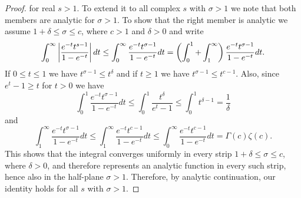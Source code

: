 \begin{proof}
	for real $s > 1$. To extend it to all complex $s$ with $\sigma > 1$ we note that both members are analytic for $\sigma > 1$. To show that the right member is analytic we assume $1 + \delta \leq \sigma \leq c$, where $c > 1$ and $\delta > 0$ and write
\begin{equation*}
	\int _0 ^\infty \left|\frac{e^{-t} t^{s - 1}}{1 - e^{-t}}\right| dt \leq \int _0 ^\infty \frac{e^{-t} t^{\sigma - 1}}{1 - e^{-t}} dt = \left(\int _0 ^1 + \int _1 ^\infty\right) \frac{e^{-t} t^{\sigma - 1}}{1 - e^{-t}} dt.
\end{equation*}
	If $0 \leq t \leq 1$ we have $t^{\sigma - 1} \leq t^\delta$ and if $t \geq 1$ we have $t^{\sigma - 1} \leq t^{c - 1}$. Also, since $e^t - 1 \geq t$ for $t > 0$ we have
\begin{equation*}
	\int _0 ^1 \frac{e^{-t} t^{\sigma - 1}}{1 - e^{-t}} dt \leq \int _0 ^1 \frac{t^\delta}{e^t - 1} \leq \int _0 ^1 t^{\delta - 1} = \frac{1}{\delta}
\end{equation*}
	and
\begin{equation*}
	\int _1 ^\infty \frac{e^{-t} t^{\sigma - 1}}{1 - e^{-t}} dt \leq \int _1 ^\infty \frac{e^{-t} t^{c - 1}}{1 - e^{-t}} dt \leq \int _0 ^\infty \frac{e^{-t} t^{c - 1}}{1 - e^{-t}} dt = \Gamma(c)\zeta(c).
\end{equation*}
	 This shows that the integral converges uniformly in every strip $1 + \delta \leq \sigma \leq c$, where $\delta > 0$, and therefore represents an analytic function in every such strip, hence also in the half-plane $\sigma > 1$. Therefore, by analytic continuation, our identity holds for all $s$ with $\sigma > 1$.
\end{proof}



